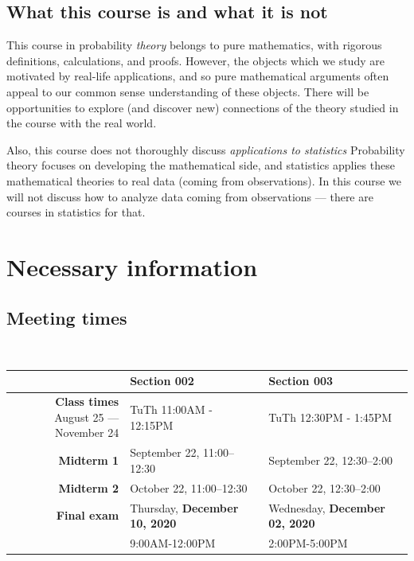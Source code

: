 \documentclass[oneside,11pt]{amsart}
\begin{document}
\subsection*{What this course is and what it is not}

This course in probability \emph{theory} belongs to pure mathematics, with
rigorous definitions, calculations, and proofs. However, the objects which we
study are motivated by real-life applications, and so pure mathematical
arguments often appeal to our common sense understanding of these objects.
There will be opportunities to explore (and discover new) connections of the
theory studied in the course with the real world.

Also, this course does not thoroughly discuss \emph{applications to statistics}
Probability
theory focuses on developing the mathematical side, and statistics applies
these mathematical theories to real data (coming from observations). In this
course we will not discuss how to analyze data coming from observations ---
there are courses in statistics for that.

\section{Necessary information}
\label{sec:necc}

\subsection{Meeting times}{\ }\\
\label{sub:meeting_times}

\begin{tabular}{|r|l|l|}
	\hline
	&Section 002&Section 003
	\\
	\hline
	\rule{0pt}{16pt}
	\parbox{.26\textwidth}{\textbf{Class times}\\
	August 25 --- November 24}
	& TuTh 11:00AM - 12:15PM &TuTh 12:30PM - 1:45PM
	\\[8pt] \hline
	\textbf{Midterm 1}   & September 22, 11:00--12:30 & September 22, 12:30--2:00
                       \\ \hline
											 \textbf{Midterm 2}   & October 22, 11:00--12:30 & October 22, 12:30--2:00
											 \\ \hline
											 \textbf{Final exam}   &  
										 Thursday, \textbf{December 10, 2020}	
											 & 
											 Wednesday, \textbf{December 02, 2020}	
											 \\ & 9:00AM-12:00PM &  2:00PM-5:00PM
                       \\ \hline
\end{tabular}
\end{document}
